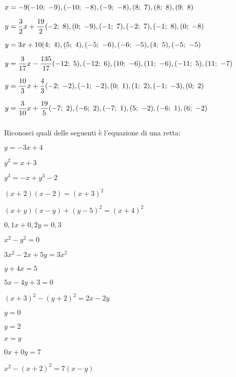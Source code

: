 \begin{esercizio}
\begin{enumeratea}
  \item  \(x = -9 \hfill (-10;~-9), (-10;~-8), (-9;~-8), (8;~7), (8;~8), (9;~8)\)
  \item  \(y = \dfrac{3}{2} x +\dfrac{19}{2} 
  \hfill (-2;~8), (0;~-9), (-1;~7), (-2;~7), (-1;~8), (0;~-8)\)
  \item  \(y = 3 x +10 
  \hfill (4;~4), (5;~4), (-5;~-6), (-6;~-5), (4;~5), (-5;~-5)\)
  \item  \(y = \dfrac{3}{17} x -\dfrac{135}{17} 
  \hfill (-12;~5), (-12;~6), (10;~-6), (11;~-6), (-11;~5), (11;~-7)\)
  \item  \(y = \dfrac{10}{3} x +\dfrac{4}{3} 
  \hfill (-2;~-2), (-1;~-2), (0;~1), (1;~2), (-1;~-3), (0;~2)\)
  \item  \(y = \dfrac{3}{10} x +\dfrac{19}{5} 
  \hfill (-7;~2), (-6;~2), (-7;~1), (5;~-2), (-6;~1), (6;~-2)\)
 \end{enumeratea}
\end{esercizio}

\subsubsection*{}

\begin{esercizio}\label{ese:02_01.} %
Riconosci quali delle seguenti è l'equazione di una retta:
\begin{multicols}{2}
 \begin{enumeratea}
  \item  \( y = -3 x +4\)
  \item  \( y^2 = x + 3\)
  \item  \( y^3 = -x + y^3 -2\)
  \item  \( (x +2)(x-2)=(x +3)^2\)
  \item  \( (x +y)(x-y) + (y-5)^2 = (x +4)^2\)
  \item  \( 0,1 x + 0,2 y = 0,3\)
  \item  \( x^2 - y^2 = 0\)
  \item  \( 3x^2 - 2x + 5y = 3x^2\)
  \item  \( y +4 x = 5\)
  \item  \( 5 x -4 y+3 = 0\)
  \item  \( (x+3)^2 - (y+2)^2 = 2 x - 2y\)
  \item  \( y = 0\)
  \item  \( y = 2\)
  \item  \( x = y\)
  \item  \( 0 x + 0 y = 7\)
  \item  \( x^2 -(x+2)^2 = 7 (x -y)\)
 \end{enumeratea}
\end{multicols}
\end{esercizio}

